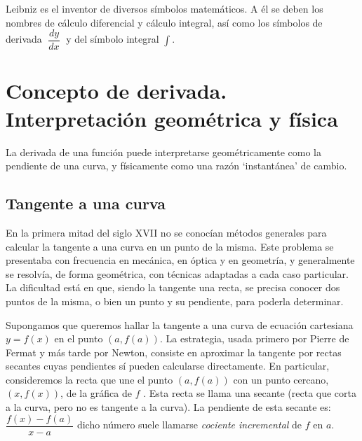 	Leibniz es el inventor de diversos símbolos matemáticos. A él se deben los nombres de cálculo diferencial y cálculo integral, así como los símbolos de derivada $\; \dfrac {dy}{dx}\; $ y del símbolo integral $\int$.

	
	\section{Concepto de derivada. Interpretación geométrica y física}
	\label{IG-derivada}
	
	
	La derivada de una función puede interpretarse geométricamente como la pendiente de una curva, y físicamente como una razón `instantánea' de cambio. 
	
	\subsection{Tangente a una curva}
	 
	En la primera mitad del siglo XVII no se conocían métodos generales para calcular la tangente a una curva en un punto de la misma. Este problema se presentaba con frecuencia en mecánica, en óptica y en geometría, y generalmente se resolvía, de forma geométrica, con técnicas adaptadas a cada caso particular. La dificultad está en que, siendo la tangente una recta, se precisa conocer dos puntos de la misma, o bien un punto y su pendiente, para poderla determinar. 
	 
	 Supongamos que queremos hallar la tangente a una curva de ecuación cartesiana $y = f (x)$ en el punto $(a, f (a))$. La estrategia, usada primero por Pierre de Fermat y más tarde por Newton, consiste en aproximar la tangente por rectas secantes cuyas pendientes sí pueden calcularse directamente. En particular, consideremos la recta que une el punto $(a, f (a))$ con un punto cercano, $(x, f (x))$, de la gráfica de $f$ . Esta recta se llama una secante (recta que corta a la curva, pero no es tangente a la curva). La pendiente de esta secante es: $\dfrac {f(x) -f(a)} {x-a}$ dicho número suele llamarse \emph{cociente incremental} de $f$ en $a$. 
	 
